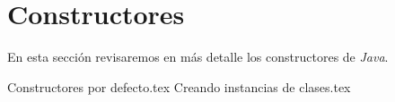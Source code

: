 \section{Constructores}
  En esta sección revisaremos en más detalle los constructores de \textit{Java}.

  {Constructores por defecto.tex}
  {Creando instancias de clases.tex}
%